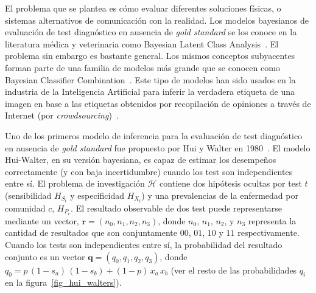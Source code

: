 \documentclass[a4paper,11pt]{book}
\theoremstyle{definition}
\begin{document}

El problema que se plantea es c\'omo evaluar diferentes soluciones f\'isicas, o sistemas alternativos de comunicaci\'on con la realidad.
%
Los modelos bayesianos de evaluaci\'on de test diagn\'ostico en ausencia de \emph{gold standard} se los conoce en la literatura m\'edica y veterinaria como Bayesian Latent Class Analysis~\cite{cheung2021-review, umemneku2019-review}.
%
El problema sin embargo es bastante general.
%
Los mismos conceptos subyacentes forman parte de una familia de modelos m\'as grande que se conocen como Bayesian Classifier Combination~\cite{kim2012-BCC}.
%
Este tipo de modelos han sido usados en la industria de la Inteligencia Artificial para inferir la verdadera etiqueta de una imagen en base a las etiquetas obtenidos por recopilaci\'on de opiniones a trav\'es de Internet (por \emph{crowdsourcing})~\cite{venanzi2014-CBBCC}.


Uno de los primeros modelo de inferencia para la evaluaci\'on de test diagn\'ostico en ausencia de \emph{gold standard} fue propuesto por Hui y Walter en 1980~\cite{hui1980-andWalter}.
%
El modelo Hui-Walter, en su versi\'on bayesiana, es capaz de estimar los desempe\~nos correctamente (y con baja incertidumbre) cuando los test son independientes entre s\'i.
%
El problema de investigaci\'on $\mathcal{H}$ contiene dos hip\'otesis ocultas por test $t$ (sensibilidad $H_{S_t}$ y especificidad $H_{X_t}$) y una prevalencias de la enfermedad por comunidad $c$, $H_{P_c}$.
%
El resultado observable de dos test puede representarse mediante un vector, $\bm{r} = (n_0,n_1,n_2,n_3)$, donde $n_0$, $n_1$, $n_2$, y $n_3$ representa la cantidad de resultados que son conjuntamente $00$, $01$, $10$ y $11$ respectivamente.
%
Cuando los tests son independientes entre s\'i, la probabilidad del resultado conjunto es un vector $\bm{q} = (q_0, q_1, q_2, q_3)$, donde $q_0 = p\,(1-s_a)\,(1-s_b) + (1-p)\, x_a \, x_b$ (ver el resto de las probabilidades $q_i$ en la figura~\ref{fig_hui_walters}).

\end{document}
